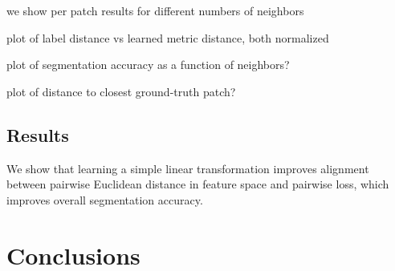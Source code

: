 \documentclass[a4paper,titlepage]{article}
\begin{document}
we show per patch results for different numbers of neighbors 

plot of label distance vs learned metric distance, both normalized\

plot of segmentation accuracy as a function of neighbors?

plot of distance to closest ground-truth patch?













\subsection{Results}










We show that learning a simple linear transformation improves alignment between pairwise Euclidean distance in feature space and pairwise loss, which improves overall segmentation accuracy.




































%

\pagebreak
\section{Conclusions}
\end{document}
